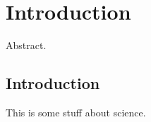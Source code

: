 \chapter{Introduction}
\label{c.intro}

\begin{chabstract}
  Abstract.
\end{chabstract}

\section{Introduction}

This is some stuff about science.
